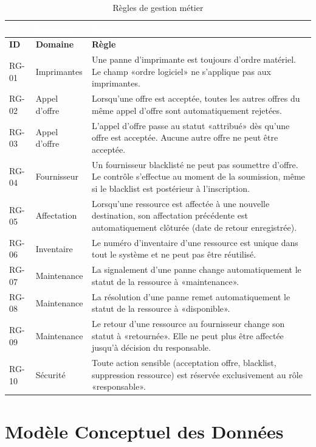 \documentclass[12pt,a4paper]{report}
\begin{document}
\begin{longtable}{|C{1.8cm}|L{4cm}|L{8cm}|}
\caption{Règles de gestion métier} \\
\hline
{}\textcolor{white}{\textbf{ID}} & \textcolor{white}{\textbf{Domaine}} & \textcolor{white}{\textbf{Règle}} \\
\hline
\endfirsthead
\hline
\textbf{ID} & \textbf{Domaine} & \textbf{Règle} \\
\hline
\endhead
RG-01 & Imprimantes & Une panne d'imprimante est toujours d'ordre matériel. Le champ «ordre logiciel» ne s'applique pas aux imprimantes. \\
\hline
RG-02 & Appel d'offre & Lorsqu'une offre est acceptée, toutes les autres offres du même appel d'offre sont automatiquement rejetées. \\
\hline
RG-03 & Appel d'offre & L'appel d'offre passe au statut «attribué» dès qu'une offre est acceptée. Aucune autre offre ne peut être acceptée. \\
\hline
RG-04 & Fournisseur & Un fournisseur blacklisté ne peut pas soumettre d'offre. Le contrôle s'effectue au moment de la soumission, même si le blacklist est postérieur à l'inscription. \\
\hline
RG-05 & Affectation & Lorsqu'une ressource est affectée à une nouvelle destination, son affectation précédente est automatiquement clôturée (date de retour enregistrée). \\
\hline
RG-06 & Inventaire & Le numéro d'inventaire d'une ressource est unique dans tout le système et ne peut pas être réutilisé. \\
\hline
RG-07 & Maintenance & La signalement d'une panne change automatiquement le statut de la ressource à «maintenance». \\
\hline
RG-08 & Maintenance & La résolution d'une panne remet automatiquement le statut de la ressource à «disponible». \\
\hline
RG-09 & Maintenance & Le retour d'une ressource au fournisseur change son statut à «retournée». Elle ne peut plus être affectée jusqu'à décision du responsable. \\
\hline
RG-10 & Sécurité & Toute action sensible (acceptation offre, blacklist, suppression ressource) est réservée exclusivement au rôle «responsable». \\
\hline
\end{longtable}

\chapter{Modèle Conceptuel des Données}
\end{document}

